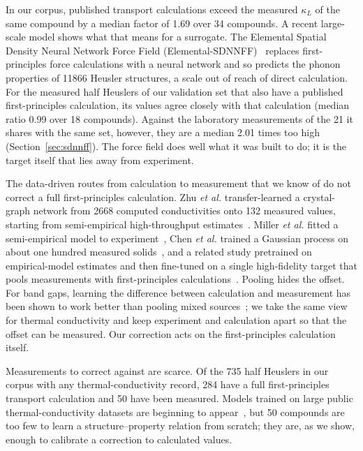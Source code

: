 In our corpus, published transport calculations exceed the measured $\kappa_L$ of the same compound
by a median factor of \num{1.69} over \num{34} compounds. A recent large-scale model shows what
that means for a surrogate. The Elemental Spatial Density Neural Network Force Field
(Elemental-SDNNFF)~\cite{rodriguez2023millionsca} replaces first-principles force calculations with
a neural network and so predicts the phonon properties of \num{11866} Heusler structures, a scale
out of reach of direct calculation. For the measured half Heuslers of our validation set that also
have a published first-principles calculation, its values agree closely with that calculation
(median ratio \num{0.99} over \num{18} compounds). Against the laboratory measurements of the
\num{21} it shares with the same set, however, they are a median \num{2.01} times too high
(Section~\ref{sec:sdnnff}). The force field does well what it was built to do; it is the target
itself that lies away from experiment.

The data-driven routes from calculation to measurement that we know of do not correct a full
first-principles calculation.
Zhu \emph{et al.} transfer-learned a crystal-graph network from \num{2668} computed conductivities
onto \num{132} measured values, starting from semi-empirical high-throughput
estimates~\cite{zhu2021charting}. Miller \emph{et al.} fitted a semi-empirical model to
experiment~\cite{miller2017capturing}, Chen \emph{et al.} trained a Gaussian process on about one
hundred measured solids~\cite{chen2019machine}, and a related study pretrained on empirical-model
estimates and then fine-tuned on a single high-fidelity target that pools measurements with
first-principles calculations~\cite{liu2022leveraging}. Pooling hides the offset. For band gaps,
learning the difference between calculation and measurement has been shown to work better than
pooling mixed sources~\cite{hutchinson2017overcoming}; we take the same view for thermal
conductivity and keep experiment and calculation apart so that the offset can be measured. Our
correction acts on the first-principles calculation itself.

Measurements to correct against are scarce. Of the \num{735} half Heuslers in our corpus with any
thermal-conductivity record, \num{284} have a full first-principles transport calculation and
\num{50} have been measured. Models trained on large public thermal-conductivity datasets are
beginning to appear~\cite{barua2024interpreta}, but \num{50} compounds are too few to learn a
structure--property relation from scratch; they are, as we show, enough to calibrate a correction
to calculated values.

